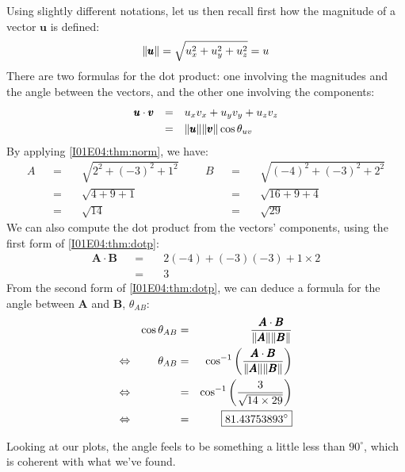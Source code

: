 \documentclass[solutions.tex]{subfiles}
\begin{document}
Using slightly different notations, let us then recall first
how the magnitude of a vector $\bm{u}$ is defined:
\begin{equation}
	\lVert \pmb{u} \rVert = \sqrt{u_x^2 + u_y^2 + u_z^2} = u
	\label{I01E04:thm:norm}
\end{equation}
There are two formulas for the dot product: one involving
the magnitudes and the angle between the vectors, and the
other one involving the components:
\begin{equation} \begin{aligned}
	\pmb{u}\cdot\pmb{v} &&=\quad& u_xv_x + u_yv_y + u_zv_z \\
	~ &&=\quad& \lVert \pmb{u} \rVert\lVert \pmb{v} \rVert\cos\theta_{uv}
	\label{I01E04:thm:dotp}
\end{aligned} \end{equation}
By applying \eqref{I01E04:thm:norm}, we have:
\begin{equation*} \begin{aligned}
	A &&=\quad& \sqrt{2^2+(-3)^2+1^2} &&& B &&=\quad& \sqrt{(-4)^2+(-3)^2+2^2} \\
	~ &&=\quad& \sqrt{4+9+1} &&& ~ &&=\quad& \sqrt{16+9+4} \\
	~ &&=\quad& \boxed{\sqrt{14}} &&& ~ &&=\quad& \boxed{\sqrt{29}}
\end{aligned} \end{equation*}
We can also compute the dot product from the vectors' components,
using the first form of \eqref{I01E04:thm:dotp}:
\begin{equation*} \begin{aligned}
	\bm{A} \cdot \bm{B} &&=\quad& 2(-4) + (-3)(-3) + 1\times 2 \\
	~ &&=\quad& \boxed{3}
\end{aligned} \end{equation*}
From the second form of \eqref{I01E04:thm:dotp}, we can deduce
a formula for the angle between $\bm{A}$ and $\bm{B}$, $\theta_{AB}$:
\begin{equation*} \begin{aligned}
	~ && \cos\theta_{AB} &=& \frac{\pmb{A}\cdot\pmb{B}}{\lVert \pmb{A} \rVert\lVert \pmb{B} \rVert} \\
	\Leftrightarrow && \theta_{AB} &=& \cos^{-1}\left(
		\frac{\pmb{A}\cdot\pmb{B}}{\lVert \pmb{A} \rVert\lVert \pmb{B} \rVert}\right) \\
	\Leftrightarrow && ~ &=& \cos^{-1}\left(\frac{3}{\sqrt{14\times 29}}\right) \\
	\Leftrightarrow && ~ &=& \boxed{81.43753893^\circ}
\end{aligned} \end{equation*}
\begin{remark} Looking at our plots, the angle feels to be something a little less
than $90^\circ$, which is coherent with what we've found.
\end{remark}
\end{document}
